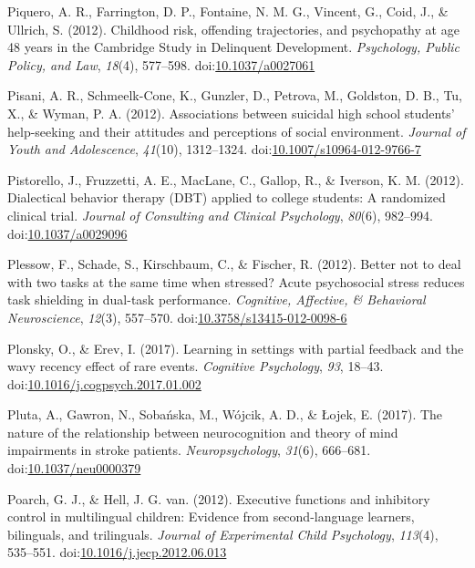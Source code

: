 \documentclass[english,man]{apa6}
\begin{document}
\hypertarget{ref-Piquero2012}{}
Piquero, A. R., Farrington, D. P., Fontaine, N. M. G., Vincent, G.,
Coid, J., \& Ullrich, S. (2012). Childhood risk, offending trajectories,
and psychopathy at age 48 years in the Cambridge Study in Delinquent
Development. \emph{Psychology, Public Policy, and Law}, \emph{18}(4),
577--598. doi:\href{https://doi.org/10.1037/a0027061}{10.1037/a0027061}

\hypertarget{ref-Pisani2012}{}
Pisani, A. R., Schmeelk-Cone, K., Gunzler, D., Petrova, M., Goldston, D.
B., Tu, X., \& Wyman, P. A. (2012). Associations between suicidal high
school students' help-seeking and their attitudes and perceptions of
social environment. \emph{Journal of Youth and Adolescence},
\emph{41}(10), 1312--1324.
doi:\href{https://doi.org/10.1007/s10964-012-9766-7}{10.1007/s10964-012-9766-7}

\hypertarget{ref-Pistorello2012}{}
Pistorello, J., Fruzzetti, A. E., MacLane, C., Gallop, R., \& Iverson,
K. M. (2012). Dialectical behavior therapy (DBT) applied to college
students: A randomized clinical trial. \emph{Journal of Consulting and
Clinical Psychology}, \emph{80}(6), 982--994.
doi:\href{https://doi.org/10.1037/a0029096}{10.1037/a0029096}

\hypertarget{ref-Plessow2012}{}
Plessow, F., Schade, S., Kirschbaum, C., \& Fischer, R. (2012). Better
not to deal with two tasks at the same time when stressed? Acute
psychosocial stress reduces task shielding in dual-task performance.
\emph{Cognitive, Affective, \& Behavioral Neuroscience}, \emph{12}(3),
557--570.
doi:\href{https://doi.org/10.3758/s13415-012-0098-6}{10.3758/s13415-012-0098-6}

\hypertarget{ref-Plonsky2017}{}
Plonsky, O., \& Erev, I. (2017). Learning in settings with partial
feedback and the wavy recency effect of rare events. \emph{Cognitive
Psychology}, \emph{93}, 18--43.
doi:\href{https://doi.org/10.1016/j.cogpsych.2017.01.002}{10.1016/j.cogpsych.2017.01.002}

\hypertarget{ref-Pluta2017}{}
Pluta, A., Gawron, N., Sobańska, M., Wójcik, A. D., \& Łojek, E. (2017).
The nature of the relationship between neurocognition and theory of mind
impairments in stroke patients. \emph{Neuropsychology}, \emph{31}(6),
666--681.
doi:\href{https://doi.org/10.1037/neu0000379}{10.1037/neu0000379}

\hypertarget{ref-Poarch2012}{}
Poarch, G. J., \& Hell, J. G. van. (2012). Executive functions and
inhibitory control in multilingual children: Evidence from
second-language learners, bilinguals, and trilinguals. \emph{Journal of
Experimental Child Psychology}, \emph{113}(4), 535--551.
doi:\href{https://doi.org/10.1016/j.jecp.2012.06.013}{10.1016/j.jecp.2012.06.013}
\end{document}
